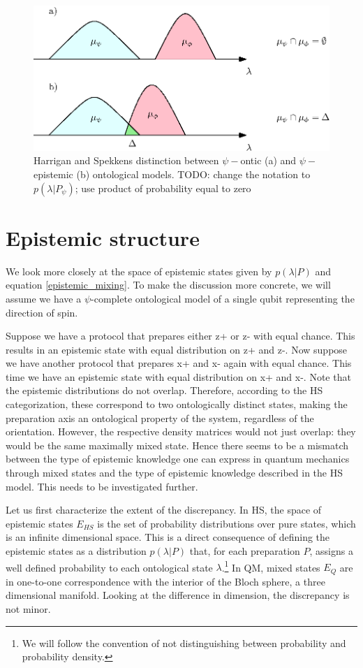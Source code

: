 \documentclass[twocolumn,prl,floatfix,superscriptaddress]{revtex4-2}
\begin{document}
\begin{figure}
\includegraphics[scale=.7]{ontic}
\caption{\footnotesize{Harrigan and Spekkens distinction between $\psi-$ontic (a) and $\psi-$epistemic (b) ontological models. TODO: change the notation to $p(\lambda | P_\psi)$; use product of probability equal to zero}}\label{overlap}
\end{figure}

\section{Epistemic structure}

We look more closely at the space of epistemic states given by $p(\lambda | P)$ and equation \ref{epistemic_mixing}. To make the discussion more concrete, we will assume we have a $\psi$-complete ontological model of a single qubit representing the direction of spin.

Suppose we have a protocol that prepares either z+ or z- with equal chance. This results in an epistemic state with equal distribution on z+ and z-. Now suppose we have another protocol that prepares x+ and x- again with equal chance. This time we have an epistemic state with equal distribution on x+ and x-. Note that the epistemic distributions do not overlap. Therefore, according to the HS categorization, these correspond to two ontologically distinct states, making the preparation axis an ontological property of the system, regardless of the orientation. However, the respective density matrices would not just overlap: they would be the same maximally mixed state. Hence there seems to be a mismatch between the type of epistemic knowledge one can express in quantum mechanics through mixed states and the type of epistemic knowledge described in the HS model. This needs to be investigated further.

Let us first characterize the extent of the discrepancy. In HS, the space of epistemic states $E_{HS}$ is the set of probability distributions over pure states, which is an infinite dimensional space. This is a direct consequence of defining the epistemic states as a distribution $p(\lambda|P)$ that, for each preparation $P$, assigns a well defined probability to each ontological state $\lambda$.\footnote{We will follow the convention of not distinguishing between probability and probability density.} In QM, mixed states $E_{Q}$ are in one-to-one correspondence with the interior of the Bloch sphere, a three dimensional manifold. Looking at the difference in dimension, the discrepancy is not minor.
\end{document}
